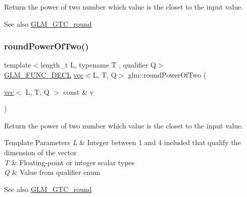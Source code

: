 Return the power of two number which value is the closet to the input value.

\begin{DoxySeeAlso}{See also}
\mbox{\hyperlink{group__gtc__round}{G\+L\+M\+\_\+\+G\+T\+C\+\_\+round}} 
\end{DoxySeeAlso}
\mbox{\label{group__gtc__round_ga258802a7d55c03c918f28cf4d241c4d0}} 
\subsubsection{\texorpdfstring{round\+Power\+Of\+Two()}{roundPowerOfTwo()}\hspace{0.1cm}{\footnotesize\ttfamily [2/2]}}
{\footnotesize\ttfamily template$<$length\+\_\+t L, typename T , qualifier Q$>$ \\
\mbox{\hyperlink{setup_8hpp_ab2d052de21a70539923e9bcbf6e83a51}{G\+L\+M\+\_\+\+F\+U\+N\+C\+\_\+\+D\+E\+CL}} \mbox{\hyperlink{structglm_1_1vec}{vec}}$<$L, T, Q$>$ glm\+::round\+Power\+Of\+Two (\begin{DoxyParamCaption}\item[{\mbox{\hyperlink{structglm_1_1vec}{vec}}$<$ L, T, Q $>$ const \&}]{v }\end{DoxyParamCaption})}

Return the power of two number which value is the closet to the input value.


\begin{DoxyTemplParams}{Template Parameters}
{\em L} & Integer between 1 and 4 included that qualify the dimension of the vector \\
\hline
{\em T} & Floating-\/point or integer scalar types \\
\hline
{\em Q} & Value from qualifier enum\\
\hline
\end{DoxyTemplParams}
\begin{DoxySeeAlso}{See also}
\mbox{\hyperlink{group__gtc__round}{G\+L\+M\+\_\+\+G\+T\+C\+\_\+round}} 
\end{DoxySeeAlso}
